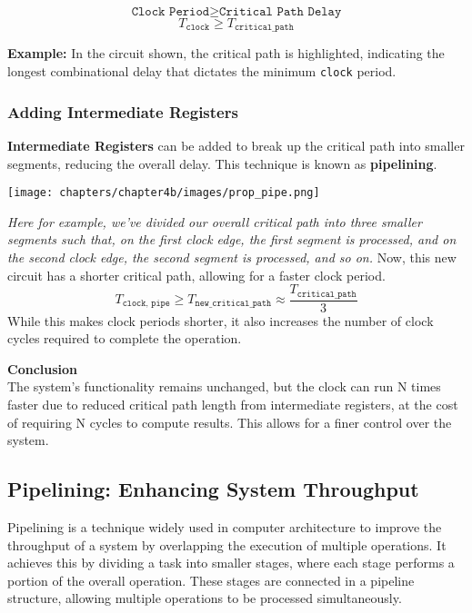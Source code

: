 \[
\texttt{Clock Period} \geq \texttt{Critical Path Delay}
\]
\[
T_{\texttt{clock}} \geq T_{\texttt{critical\_path}}
\]


\noindent \textbf{Example:} In the circuit shown, the critical path is highlighted, indicating the longest combinational delay that dictates the minimum \texttt{clock} period.

\newpage

\subsubsection{Adding Intermediate Registers}
\textbf{Intermediate Registers} can be added to break up the critical path into smaller segments, reducing the overall delay. This technique is known as \textbf{pipelining}.
\begin{center}
    \texttt{[image: chapters/chapter4b/images/prop\_pipe.png]}
\end{center}
\textit{Here for example, we've divided our overall critical path into three smaller segments such that, on the first clock edge, the first segment is processed, and on the second clock edge, the second segment is processed, and so on.}
Now, this new circuit has a shorter critical path, allowing for a faster clock period.
$$T_{\texttt{clock, pipe}} \geq T_{\texttt{new\_critical\_path}} \approx \frac{T_{\texttt{critical\_path}}}{3}$$
While this makes clock periods shorter, it also increases the number of clock cycles required to complete the operation.

\noindent \textbf{Conclusion} \\
The system's functionality remains unchanged, but the clock can run N times faster due to reduced critical path length from intermediate registers, at the cost of requiring N cycles to compute results. This allows for a finer control over the system.

\subsection{Pipelining: Enhancing System Throughput}

Pipelining is a technique widely used in computer architecture to improve the throughput of a system by overlapping the execution of multiple operations. It achieves this by dividing a task into smaller stages, where each stage performs a portion of the overall operation. These stages are connected in a pipeline structure, allowing multiple operations to be processed simultaneously.

